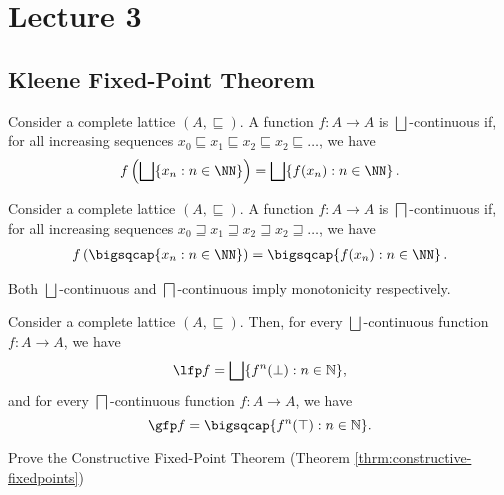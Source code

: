 \section{Lecture 3}
\subsection{Kleene Fixed-Point Theorem}
\begin{definition}
    Consider a complete lattice $(A, \sqsubseteq)$.
	A function $f \colon A \to A$ is $\bigsqcup$-continuous if, for all increasing sequences $x_0 \sqsubseteq x_1 \sqsubseteq x_2 \sqsubseteq x_2 \sqsubseteq \ldots$, we have
    \begin{align*}
        f \left( \bigsqcup \{ x_n : n \in \NN \} \right) = \bigsqcup \{ f(x_n) : n \in \NN \} \,.
    \end{align*}
\end{definition}


\begin{definition}
    Consider a complete lattice $(A, \sqsubseteq)$.
	A function $f \colon A \to A$ is $\bigsqcap$-continuous if, for all increasing sequences $x_0 \sqsupseteq x_1 \sqsupseteq x_2 \sqsupseteq x_2 \sqsupseteq \ldots$, we have
 \begin{align*}
     	f \left( \bigsqcap \{ x_n : n \in \NN \} \right) = \bigsqcap \{ f(x_n) : n \in \NN \} \,.
 \end{align*}
\end{definition}

\begin{lemma}
    Both $\bigsqcup$-continuous and $\bigsqcap$-continuous imply monotonicity respectively. 
\end{lemma}



\begin{theorem}
    \label{thrm:constructive-fixedpoints}
    Consider a complete lattice $(A, \sqsubseteq)$. Then, for every $\bigsqcup$-continuous function $f \colon A \to A$, we have
    \[
    \lfp f = \bigsqcup \{ f^n(\bot) : n \in \mathbb{N} \},
    \]
    and for every $\bigsqcap$-continuous function $f \colon A \to A$, we have
    \[
    \gfp f = \bigsqcap \{ f^n(\top) : n \in \mathbb{N} \}.
    \]
\end{theorem}    


\begin{exercise}
    Prove the Constructive Fixed-Point Theorem (Theorem \ref{thrm:constructive-fixedpoints})
\end{exercise}
	

